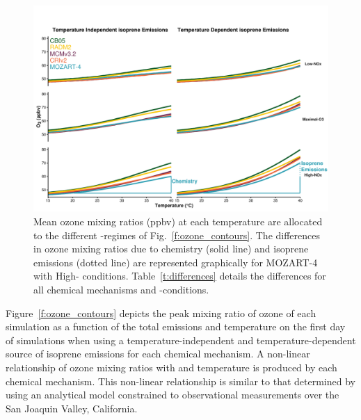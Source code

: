 \begin{figure}[t]%
    \centering%
    \caption{Mean ozone mixing ratios (ppbv) at each temperature are allocated to the different -regimes of Fig.~\ref{f:ozone_contours}. The differences in ozone mixing ratios due to chemistry (solid line) and isoprene emissions (dotted line) are represented graphically for MOZART-4 with High- conditions. Table~\ref{t:differences} details the differences for all chemical mechanisms and -conditions.}%
    \label{f:O3-T}%
    \includegraphics[width=\textwidth]{img/O3-T_correlation}%
    \vspace{-4mm}
\end{figure}

\begin{table}[t]%
    \centering%
    \caption{Increase in mean ozone mixing ratio (ppbv) due to chemistry and temperature-dependent isoprene emissions from the reference temperature ($20$~\degree C) at $40$~\degree C in the -regimes of Fig.~\ref{f:O3-T}.}%
    \label{t:differences}%
    \vspace{-4mm}
\end{table}

Figure~\ref{f:ozone_contours} depicts the peak mixing ratio of ozone of each simulation as a function of the total  emissions and temperature on the first day of simulations when using a temperature-independent and temperature-dependent source of isoprene emissions for each chemical mechanism.
A non-linear relationship of ozone mixing ratios with  and temperature is produced by each chemical mechanism.
This non-linear relationship is similar to that determined by \citet{Pusede:2014} using an analytical model constrained to observational measurements over the San Joaquin Valley, California.


